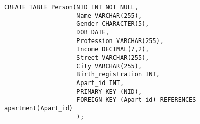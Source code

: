 \documentclass[a4paper, 12pt]{article}
\begin{document}
\begin{verbatim}
CREATE TABLE Person(NID INT NOT NULL,
                    Name VARCHAR(255),
                    Gender CHARACTER(5),
                    DOB DATE,
                    Profession VARCHAR(255),
                    Income DECIMAL(7,2),
                    Street VARCHAR(255),
                    City VARCHAR(255),
                    Birth_registration INT,
                    Apart_id INT,
                    PRIMARY KEY (NID),
                    FOREIGN KEY (Apart_id) REFERENCES apartment(Apart_id)
                    );


\end{verbatim}
\end{document}
